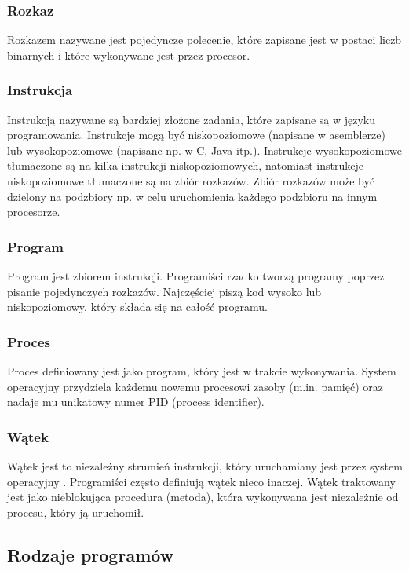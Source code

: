 \documentclass[12pt]{article}
\begin{document}
\subsubsection*{Rozkaz}
\noindent Rozkazem nazywane jest pojedyncze polecenie, które zapisane jest w postaci liczb binarnych i które
wykonywane jest przez procesor.

\subsubsection*{Instrukcja}
\noindent Instrukcją nazywane są bardziej złożone zadania, które zapisane są w języku programowania. Instrukcje
mogą być niskopoziomowe (napisane w asemblerze) lub wysokopoziomowe (napisane np. w C, Java itp.).
Instrukcje wysokopoziomowe tłumaczone są na kilka instrukcji niskopoziomowych, natomiast instrukcje
niskopoziomowe tłumaczone są na zbiór rozkazów. Zbiór rozkazów może być dzielony na podzbiory np. w celu
uruchomienia każdego podzbioru na innym procesorze.

\subsubsection*{Program}
\noindent Program jest zbiorem instrukcji. Programiści rzadko tworzą programy poprzez pisanie pojedynczych rozkazów.
Najczęściej piszą kod wysoko lub niskopoziomowy, który składa się na całość programu.

\subsubsection*{Proces}
\noindent Proces definiowany jest jako program, który jest w trakcie wykonywania. System operacyjny przydziela
każdemu nowemu procesowi zasoby (m.in. pamięć) oraz nadaje mu unikatowy numer PID (process identifier). 

\subsubsection*{Wątek}
Wątek jest to niezależny strumień instrukcji, który uruchamiany jest przez system operacyjny
\cite{programowanie-rozproszone-i-rownolegle}. Programiści często definiują wątek nieco inaczej. Wątek
traktowany jest jako nieblokująca procedura (metoda), która wykonywana jest niezależnie od procesu, który ją uruchomił.

\subsection{Rodzaje programów}
\end{document}

